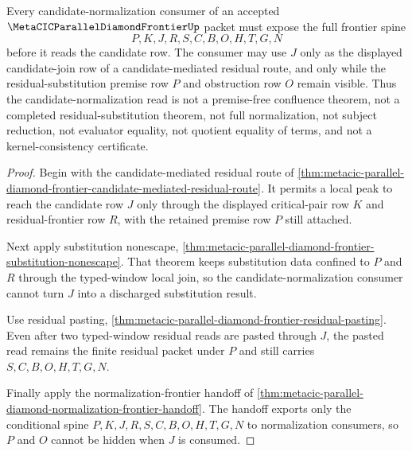 \begin{theorem}
\label{thm:metacic-parallel-diamond-frontier-candidate-normalization-scope}
Every candidate-normalization consumer of an accepted $\MetaCICParallelDiamondFrontierUp$ packet must expose the full frontier spine
$$
P,K,J,R,S,C,B,O,H,T,G,N
$$
before it reads the candidate row. The consumer may use $J$ only as the displayed candidate-join row of a candidate-mediated residual route, and only while the residual-substitution premise row $P$ and obstruction row $O$ remain visible. Thus the candidate-normalization read is not a premise-free confluence theorem, not a completed residual-substitution theorem, not full normalization, not subject reduction, not evaluator equality, not quotient equality of terms, and not a kernel-consistency certificate.
\end{theorem}
\begin{proof}
Begin with the candidate-mediated residual route of \autoref{thm:metacic-parallel-diamond-frontier-candidate-mediated-residual-route}. It permits a local peak to reach the candidate row $J$ only through the displayed critical-pair row $K$ and residual-frontier row $R$, with the retained premise row $P$ still attached.

Next apply substitution nonescape, \autoref{thm:metacic-parallel-diamond-frontier-substitution-nonescape}. That theorem keeps substitution data confined to $P$ and $R$ through the typed-window local join, so the candidate-normalization consumer cannot turn $J$ into a discharged substitution result.

Use residual pasting, \autoref{thm:metacic-parallel-diamond-frontier-residual-pasting}. Even after two typed-window residual reads are pasted through $J$, the pasted read remains the finite residual packet under $P$ and still carries $S,C,B,O,H,T,G,N$.

Finally apply the normalization-frontier handoff of \autoref{thm:metacic-parallel-diamond-normalization-frontier-handoff}. The handoff exports only the conditional spine $P,K,J,R,S,C,B,O,H,T,G,N$ to normalization consumers, so $P$ and $O$ cannot be hidden when $J$ is consumed.
\end{proof}

